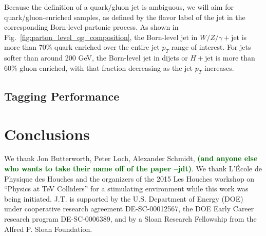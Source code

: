 \documentclass[11pt,letterpaper]{article}
\DeclareRobustCommand{\Fig}[1]{Fig.~\ref{#1}}
\newcommand{\jdt}[1]{\textbf{\textcolor{darkgreen}{(#1 --jdt)}}}
\begin{document}
Because the definition of a quark/gluon jet is ambiguous, we will aim for quark/gluon-enriched samples, as defined by the flavor label of the jet in the corresponding Born-level partonic process.  As shown in \Fig{fig:parton_level_qg_composition}, the Born-level jet in $W/Z/\gamma + \text{jet}$ is more than 70\% quark enriched over the entire jet $p_T$ range of interest.  For jets softer than around 200 GeV, the Born-level jet in dijets or $H+\text{jet}$ is more than 60\% gluon enriched, with that fraction decreasing as the jet $p_T$ increases.  

\subsection{Tagging Performance}


\section{Conclusions}
\label{sec:conclude}




\begin{acknowledgments}
We thank Jon Butterworth, Peter Loch, Alexander Schmidt, \jdt{and anyone else who wants to take their name off of the paper}.  We thank L'\'{E}cole de Physique des Houches and the organizers of the 2015 Les Houches workshop on ``Physics at TeV Colliders'' for a stimulating environment while this work was being initiated.  J.T. is supported by the U.S. Department of Energy (DOE) under cooperative research agreement DE-SC-00012567, the DOE Early Career research program DE-SC-0006389, and by a Sloan Research Fellowship from the Alfred P. Sloan Foundation.

\end{acknowledgments}




\end{document}
